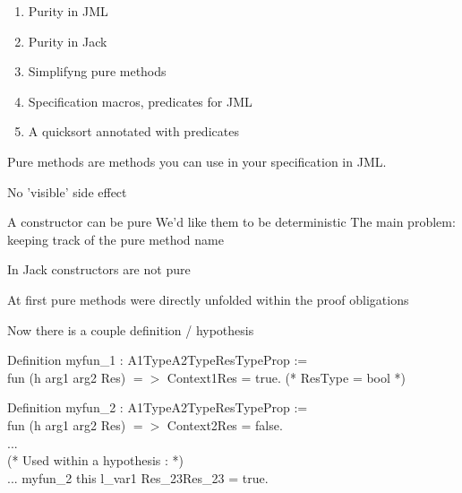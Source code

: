 \begin{enumerate}
\item Purity in JML

\item Purity in Jack
\item Simplifyng pure methods
\item Specification macros, predicates for JML
\item A quicksort annotated with predicates


\end{enumerate}

Pure methods are methods you can {\purple use in your specification} 
in JML.
\blist \small
\item No 'visible' side effect
\item A constructor can be pure
\elist
\rarrow We'd like them to be deterministic
The main problem: keeping track of the pure method name

\small
\blist
\item In Jack constructors are not pure
\item At first pure methods were directly unfolded 
  within the proof obligations
\item Now there is a couple definition / hypothesis 

\elist

{\purple Definition} myfun\_1 : A1Type\rarrow A2Type\rarrow ResType\rarrow Prop :=\\
{\purple fun} (h arg1 arg2 Res) {\purple $=>$} Context1\rarrow Res = true. (* ResType = bool *)

{\purple Definition} myfun\_2 : A1Type\rarrow A2Type\rarrow ResType\rarrow Prop :=\\
{\purple fun} (h arg1 arg2 Res) {\purple $=>$} Context2\rarrow Res = false.\\
...\\
(* Used within a hypothesis : *)\\
... \rarrow myfun\_2 this l\_var1 Res\_23\rarrow Res\_23 = true.\\

